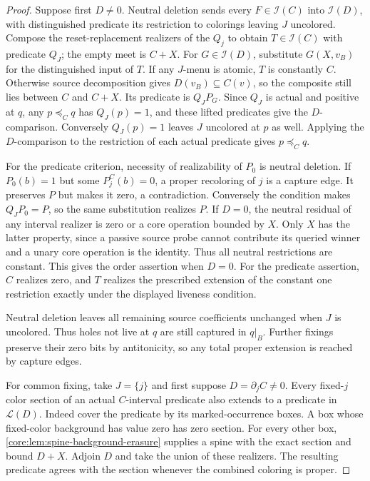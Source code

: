 \begin{proof}
Suppose first $D\ne0$. Neutral deletion sends every $F\in\mathcal I(C)$ into
$\mathcal I(D)$, with distinguished predicate its restriction to
colorings leaving $J$ uncolored. Compose the reset-replacement
realizers of the $Q_j$ to obtain $T\in\mathcal I(C)$ with predicate
$Q_J$; the empty meet is $C+X$.
For $G\in\mathcal I(D)$, substitute $G(X,v_B)$ for the distinguished
input of $T$. If any $J$-menu is atomic, $T$ is constantly $C$.
Otherwise source decomposition gives $D(v_B)\subseteq C(v)$, so the
composite still lies between $C$ and $C+X$. Its predicate is $Q_JP_G$.
Since $Q_J$ is actual and positive at $q$, any $p\preceq_Cq$ has
$Q_J(p)=1$, and these lifted predicates give the $D$-comparison.
Conversely $Q_J(p)=1$ leaves $J$ uncolored at $p$ as well. Applying
the $D$-comparison to the restriction of each actual predicate gives
$p\preceq_Cq$.

For the predicate criterion, necessity of realizability of $P_0$ is
neutral deletion. If $P_0(b)=1$ but some $P_j^C(b)=0$, a proper
recoloring of $j$ is a capture edge. It preserves $P$ but makes it
zero, a contradiction. Conversely the condition makes $Q_JP_0=P$,
so the same substitution realizes $P$. If $D=0$, the neutral
residual of any interval realizer is zero or a core operation bounded
by $X$. Only $X$ has the latter property, since a passive source
probe cannot contribute its queried winner and a unary core operation
is the identity. Thus all neutral restrictions are constant. This
gives the order assertion when $D=0$. For the predicate assertion,
$C$ realizes zero, and $T$ realizes the prescribed extension of the
constant one restriction exactly under the displayed liveness condition.

Neutral deletion leaves all remaining source coefficients unchanged
when $J$ is uncolored. Thus holes not live at $q$ are still captured
in $q|_B$. Further fixings preserve their zero bits by antitonicity,
so any total proper extension is reached by capture edges.

For common fixing, take $J=\{j\}$ and first suppose $D=\partial_jC\ne0$.
Every fixed-$j$ color section of an actual $C$-interval predicate
also extends to a predicate in $\mathcal L(D)$. Indeed cover the
predicate by its marked-occurrence boxes. A box whose fixed-color
background has value zero has zero section. For every other box,
\cref{core:lem:spine-background-erasure} supplies a spine with the
exact section and bound $D+X$. Adjoin $D$ and take the union of
these realizers. The resulting predicate agrees with the section
whenever the combined coloring is proper.


\end{proof}
